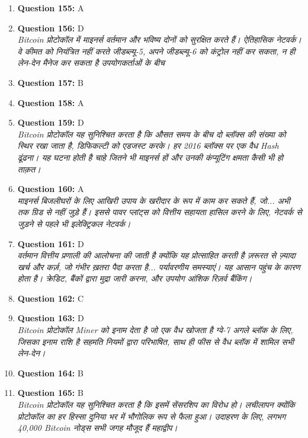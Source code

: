 \documentclass[12pt,a4paper]{article}
\begin{document}
\begin{enumerate}
\item \textbf{Question 155:} A

\item \textbf{Question 156:} D
\\ \textit{Bitcoin प्रोटोकॉल में माइनर्स वर्तमान और भविष्य दोनों को सुरक्षित करते हैं। ऐतिहासिक नेटवर्क। वे कीमत को नियंत्रित नहीं करते जीडब्ल्यू-5, अपने जीडब्ल्यू-6 को कंट्रोल नहीं कर सकता, न ही लेन-देन मैनेज कर सकता है उपयोगकर्ताओं के बीच}

\item \textbf{Question 157:} B

\item \textbf{Question 158:} A

\item \textbf{Question 159:} D
\\ \textit{Bitcoin प्रोटोकॉल यह सुनिश्चित करता है कि औसत समय के बीच दो ब्लॉक्स की संख्या को स्थिर रखा जाता है, डिफिकल्टी को एडजस्ट करके। हर 2016 ब्लॉक्स पर एक वैध Hash ढूंढना। यह घटना होती है चाहे जितने भी माइनर्स हों और उनकी कंप्यूटिंग क्षमता कैसी भी हो ताक़त।}

\item \textbf{Question 160:} A
\\ \textit{माइनर्स बिजलीघरों के लिए आखिरी उपाय के खरीदार के रूप में काम कर सकते हैं, जो... अभी तक ग्रिड से नहीं जुड़े हैं। इससे पावर प्लांट्स को वित्तीय सहायता हासिल करने के लिए, नेटवर्क से जुड़ने से पहले भी इलेक्ट्रिकल नेटवर्क।}

\item \textbf{Question 161:} D
\\ \textit{वर्तमान वित्तीय प्रणाली की आलोचना की जाती है क्योंकि यह प्रोत्साहित करती है ज़रूरत से ज़्यादा खर्च और कर्ज़, जो गंभीर ख़तरा पैदा करता है... पर्यावरणीय समस्याएं। यह आसान पहुंच के कारण होता है। क्रेडिट, बैंकों द्वारा मुद्रा जारी करना, और उपयोग आंशिक रिज़र्व बैंकिंग।}

\item \textbf{Question 162:} C

\item \textbf{Question 163:} D
\\ \textit{Bitcoin प्रोटोकॉल Miner को इनाम देता है जो एक वैध खोजता है ग्वे-7 अगले ब्लॉक के लिए, जिसका इनाम राशि है सहमति नियमों द्वारा परिभाषित, साथ ही फीस से वैध ब्लॉक में शामिल सभी लेन-देन।}

\item \textbf{Question 164:} B

\item \textbf{Question 165:} B
\\ \textit{Bitcoin प्रोटोकॉल यह सुनिश्चित करता है कि इसमें सेंसरशिप का विरोध हो। लचीलापन क्योंकि प्रोटोकॉल का हर हिस्सा दुनिया भर में भौगोलिक रूप से फैला हुआ। उदाहरण के लिए, लगभग 40,000 Bitcoin नोड्स सभी जगह मौजूद हैं महाद्वीप।}


\end{enumerate}
\end{document}
